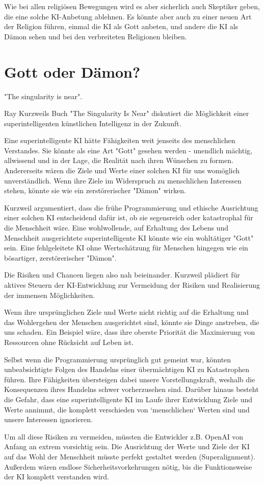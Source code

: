 \documentclass[10pt]{article}
\begin{document}
Wie bei allen religiösen Bewegungen wird es aber sicherlich auch Skeptiker geben, die eine solche KI-Anbetung ablehnen.
Es könnte aber auch zu einer neuen Art der Religion führen, einmal die KI als Gott anbeten, und andere die KI als Dämon sehen und bei den verbreiteten Religionen bleiben.
\cite{BR}
\section{Gott oder Dämon?}
"The singularity is near".

Ray Kurzweils Buch "The Singularity Is Near" diskutiert die Möglichkeit einer superintelligenten künstlichen Intelligenz in der Zukunft.

Eine superintelligente KI hätte Fähigkeiten weit jenseits des menschlichen Verstandes.
Sie könnte als eine Art "Gott" gesehen werden - unendlich mächtig, allwissend und in der Lage, die Realität nach ihren Wünschen zu formen.
Andererseits wären die Ziele und Werte einer solchen KI für uns womöglich unverständlich.
Wenn ihre Ziele im Widerspruch zu menschlichen Interessen stehen, könnte sie wie ein zerstörerischer "Dämon" wirken.

Kurzweil argumentiert, dass die frühe Programmierung und ethische Ausrichtung einer solchen KI entscheidend dafür ist, ob sie segensreich oder katastrophal für die Menschheit wäre.
Eine wohlwollende, auf Erhaltung des Lebens und Menschheit ausgerichtete superintelligente KI könnte wie ein wohltätiger "Gott" sein. Eine fehlgeleitete KI ohne Wertschätzung für Menschen hingegen wie ein bösartiger, zerstörerischer "Dämon".

Die Risiken und Chancen liegen also nah beieinander. Kurzweil plädiert für aktives Steuern der KI-Entwicklung zur Vermeidung der Risiken und Realisierung der immensen Möglichkeiten.


Wenn ihre ursprünglichen Ziele und Werte nicht richtig auf die Erhaltung und das Wohlergehen der Menschen ausgerichtet sind, könnte sie Dinge anstreben, die uns schaden.
Ein Beispiel wäre, dass ihre oberste Priorität die Maximierung von Ressourcen ohne Rücksicht auf Leben ist.

Selbst wenn die Programmierung ursprünglich gut gemeint war, könnten unbeabsichtigte Folgen des Handelns einer übermächtigen KI zu Katastrophen führen.
Ihre Fähigkeiten übersteigen dabei unsere Vorstellungskraft, weshalb die Konsequenzen ihres Handelns schwer vorherzusehen sind.
Darüber hinaus besteht die Gefahr, dass eine superintelligente KI im Laufe ihrer Entwicklung Ziele und Werte annimmt, die komplett verschieden von `menschlichen` Werten sind und unsere Interessen ignorieren.

Um all diese Risiken zu vermeiden, müssten die Entwickler z.B. OpenAI von Anfang an extrem vorsichtig sein.
Die Ausrichtung der Werte und Ziele der KI auf das Wohl der Menschheit müsste perfekt gestaltet werden (Superalignment).
Außerdem wären endlose Sicherheitsvorkehrungen nötig, bis die Funktionsweise der KI komplett verstanden wird.
\cite{KurzweilBuch}
\cite{Openai}



\end{document}
